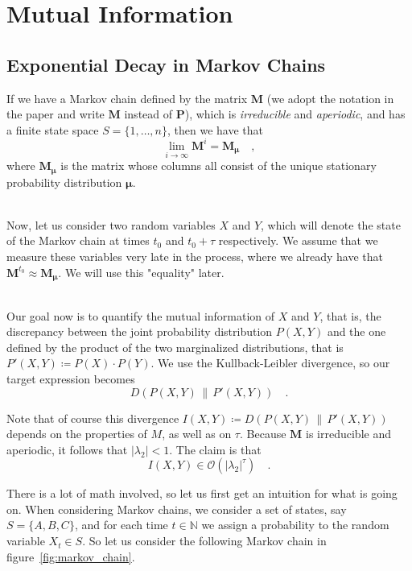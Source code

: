 \documentclass[../../main.tex]{subfiles}
\begin{document}
\section{Mutual Information}
\subsection{Exponential Decay in Markov Chains}
    \noindent
    If we have a Markov chain defined by the matrix $\boldsymbol{M}$ (we adopt the notation in the paper and write $\bm{M}$ instead of $\bm{P}$), which is \emph{irreducible} and \emph{aperiodic}, and has a finite state space $S = \{1, \dots, n\}$, then we have that
    \[
        \lim_{i \to \infty} \boldsymbol{M}^i = \boldsymbol{M}_{\boldsymbol{\mu}} \quad ,
    \]
    where $\boldsymbol{M_\mu}$ is the matrix whose columns all consist of the unique stationary probability distribution $\boldsymbol{\mu}$.

    ~\\
    Now, let us consider two random variables $X$ and $Y$, which will denote the state of the Markov chain at times $t_0$ and $t_0 + \tau$ respectively. We assume that we measure these variables very late in the process, where we already have that $\boldsymbol{M}^{t_0} \approx \boldsymbol{M}_{\boldsymbol{\mu}}$. We will use this "equality" later.

    ~\\
    Our goal now is to quantify the mutual information of $X$ and $Y$, that is, the discrepancy between the joint probability distribution $P(X, Y)$ and the one defined by the product of the two marginalized distributions, that is $P'(X, Y) \coloneqq P(X) \cdot P(Y)$. We use the Kullback-Leibler divergence, so our target expression becomes
    \[
        D(P(X, Y) \,\|\, P'(X, Y)) \quad .
    \]

    \smallskip \noindent
    Note that of course this divergence $I(X, Y) \coloneqq D(P(X, Y) \,\|\, P'(X, Y))$ depends on the properties of $M$, as well as on $\tau$. Because $\boldsymbol{M}$ is irreducible and aperiodic, it follows that $|\lambda_2| < 1$. The claim is that
    \[
        I(X, Y) \in \mathcal{O}(|\lambda_2|^\tau) \quad .
    \]
    
    \bigskip \noindent
    There is a lot of math involved, so let us first get an intuition for what is going on. When considering Markov chains, we consider a set of states, say $S = \{A, B, C\}$, and for each time $t \in \mathbb{N}$ we assign a probability to the random variable $X_t \in S$. So let us consider the following Markov chain in figure~\ref{fig:markov_chain}.
\end{document}

